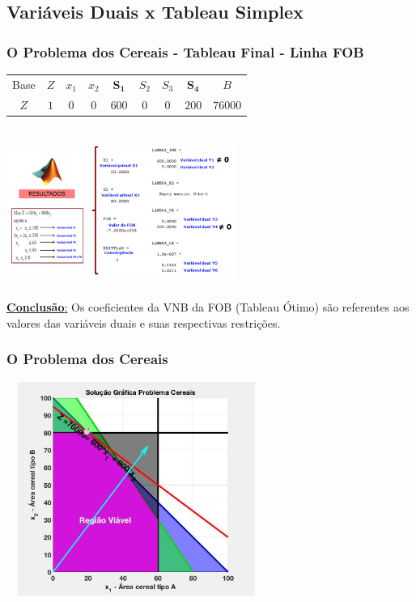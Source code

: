 \documentclass{beamer}
\begin{document}
\subsection{Variáveis Duais x Tableau Simplex}
\begin{frame}
	\frametitle{O Problema dos Cereais - Tableau Final - Linha FOB}
	\centering
	\begin{table}
		\scriptsize
		\begin{tabular}{c c c c c c c c c}
			\cellcolor{blue} {\color{white} Base} &
			\cellcolor{blue} {\color{white} $Z$} &
			\cellcolor{blue} {\color{white} $x_1$} &
			\cellcolor{blue} {\color{white} $x_2$} &
			\cellcolor{blue} {\color{red} $\mathbf{S_1}$} &
			\cellcolor{blue} {\color{white} $S_2$} &
			\cellcolor{blue} {\color{white} $S_3$} &
			\cellcolor{blue} {\color{red} $\mathbf{S_4}$} &
			\cellcolor{blue} {\color{white} $B$} \\
			\cellcolor{blue} {\color{white} $Z$} &
			\cellcolor{yellow} $1$& 
			\cellcolor{yellow} $0$& 
			\cellcolor{yellow} $0$& 
			\cellcolor{red} $600$& 
			\cellcolor{yellow} $0$& 
			\cellcolor{yellow} $0$& 
			\cellcolor{red} $200$&
			\cellcolor{yellow} $76000$\\
		\end{tabular}
	\end{table} 
	\includegraphics[width=7.5cm,height=5.5cm]{Prob_Agricultor.png}\\
	\scriptsize
	\underline{\textbf{Conclusão}:} Os coeficientes da VNB da FOB (Tableau Ótimo) são referentes aos valores das variáveis duais e suas respectivas restrições.
\end{frame}

\begin{frame}
	\frametitle{O Problema dos Cereais}
	\centering
	\includegraphics[width=8.5cm,height=7cm]{anima_22.jpg}
\end{frame}
\end{document}
